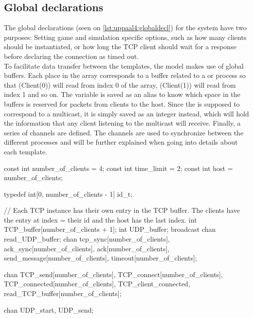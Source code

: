 \subsection*{Global declarations}
The global declarations (seen on \autoref{lst:uppaal4:globaldecl}) for the system have two purposes: Setting game and simulation specific options, such as how many clients should be instantiated, or how long the TCP client should wait for a response before declaring the connection as timed out.
\\
To facilitate data transfer between the templates, the model makes use of global buffers.
Each place in the  array corresponds to a buffer related to a  or  process so that \uppProc(Client(0)) will read from index 0 of the array, \uppProc(Client(1)) will read from index 1 and so on.
The  variable is saved as an alias to know which space in the buffers is reserved for packets from clients to the host.
Since the  is supposed to correspond to a multicast, it is simply saved as an integer instead, which will hold the information that any client listening to the multicast will receive.
Finally, a series of channels are defined.
The channels are used to synchronize between the different processes and will be further explained when going into details about each template.

\begin{uppaalcode}[caption={Global declarations}, label={lst:uppaal4:globaldecl},captionpos=b]
const int number_of_clients = 4;
const int time_limit = 2;
const int host = number_of_clients;

typedef int[0, number_of_clients - 1] id_t;

// Each TCP instance has their own entry in the TCP buffer. The clients have the entry at index = their id and the host has the last index.
int TCP_buffer[number_of_clients + 1];
int UDP_buffer;
broadcast chan read_UDP_buffer;
chan tcp_sync[number_of_clients], ack_sync[number_of_clients], ack[number_of_clients], send_message[number_of_clients], timeout[number_of_clients];

chan TCP_send[number_of_clients], TCP_connect[number_of_clients], TCP_connected[number_of_clients], TCP_client_connected, read_TCP_buffer[number_of_clients];

chan UDP_start, UDP_send;
\end{uppaalcode}

